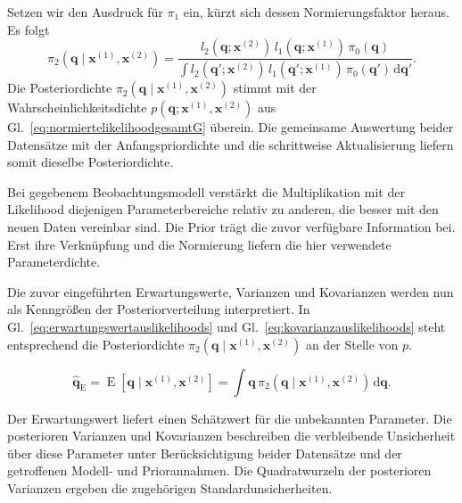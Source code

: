Setzen wir den Ausdruck für $\pi_1$ ein, kürzt sich dessen
Normierungsfaktor heraus. Es folgt
\begin{equation}
\pi_2(\mathbf q\mid\mathbf x^{(1)},\mathbf x^{(2)})
=
\frac{
l_2(\mathbf q;\mathbf x^{(2)})
\,l_1(\mathbf q;\mathbf x^{(1)})\,\pi_0(\mathbf q)
}{
\displaystyle\int
l_2(\mathbf q';\mathbf x^{(2)})
\,l_1(\mathbf q';\mathbf x^{(1)})\,\pi_0(\mathbf q')
\,\mathrm d\mathbf q'
}.
\label{eq:posteriorwielikelihoodgesamtG}
\end{equation}
Die Posteriordichte $\pi_2(\mathbf q\mid\mathbf x^{(1)},\mathbf x^{(2)})$
stimmt mit der Wahrscheinlichkeitsdichte
$p(\mathbf q;\mathbf x^{(1)},\mathbf x^{(2)})$ aus
Gl.~\eqref{eq:normiertelikelihoodgesamtG} überein.
Die gemeinsame Auswertung beider Datensätze mit der
Anfangspriordichte und die schrittweise Aktualisierung
liefern somit dieselbe Posteriordichte.

Bei gegebenem Beobachtungsmodell verstärkt die Multiplikation mit der
Likelihood diejenigen Parameterbereiche relativ zu anderen, die besser
mit den neuen Daten vereinbar sind. Die Prior trägt die zuvor verfügbare
Information bei. Erst ihre Verknüpfung und die Normierung liefern die
hier verwendete Parameterdichte.

Die zuvor eingeführten Erwartungswerte, Varianzen und
Kovarianzen werden nun als Kenngrößen der Posteriorverteilung
interpretiert. In Gl.~\eqref{eq:erwartungswertauslikelihoods}
und Gl.~\eqref{eq:kovarianzauslikelihoods} steht entsprechend
die Posteriordichte
$\pi_2(\mathbf q\mid\mathbf x^{(1)},\mathbf x^{(2)})$
an der Stelle von $p$.

\begin{equation}
\widehat{\mathbf q}_{\mathrm E}
=
\operatorname E[
\mathbf q\mid\mathbf x^{(1)},\mathbf x^{(2)}]
=
\int
\mathbf q\,
\pi_2(\mathbf q\mid\mathbf x^{(1)},\mathbf x^{(2)})
\,\mathrm d\mathbf q.
\end{equation}

Der Erwartungswert liefert einen Schätzwert für die
unbekannten Parameter. Die posterioren Varianzen und
Kovarianzen beschreiben die verbleibende Unsicherheit
über diese Parameter unter Berücksichtigung beider
Datensätze und der getroffenen Modell- und Priorannahmen.
Die Quadratwurzeln der posterioren Varianzen ergeben
die zugehörigen Standardunsicherheiten.

